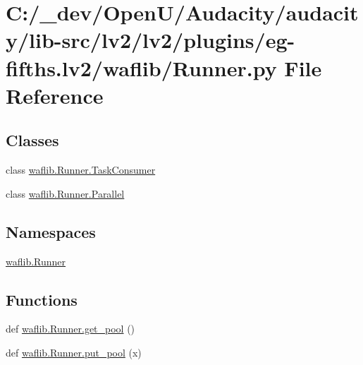 \hypertarget{lv2_2plugins_2eg-fifths_8lv2_2waflib_2_runner_8py}{}\section{C\+:/\+\_\+dev/\+Open\+U/\+Audacity/audacity/lib-\/src/lv2/lv2/plugins/eg-\/fifths.lv2/waflib/\+Runner.py File Reference}
\label{lv2_2plugins_2eg-fifths_8lv2_2waflib_2_runner_8py}
\subsection*{Classes}
\begin{DoxyCompactItemize}
\item 
class \hyperlink{classwaflib_1_1_runner_1_1_task_consumer}{waflib.\+Runner.\+Task\+Consumer}
\item 
class \hyperlink{classwaflib_1_1_runner_1_1_parallel}{waflib.\+Runner.\+Parallel}
\end{DoxyCompactItemize}
\subsection*{Namespaces}
\begin{DoxyCompactItemize}
\item 
 \hyperlink{namespacewaflib_1_1_runner}{waflib.\+Runner}
\end{DoxyCompactItemize}
\subsection*{Functions}
\begin{DoxyCompactItemize}
\item 
def \hyperlink{namespacewaflib_1_1_runner_a30bf6bcb906d0ab627890f2174b1e463}{waflib.\+Runner.\+get\+\_\+pool} ()
\item 
def \hyperlink{namespacewaflib_1_1_runner_a1e26175912d7655d9c38a50d71caeb6f}{waflib.\+Runner.\+put\+\_\+pool} (x)
\end{DoxyCompactItemize}
